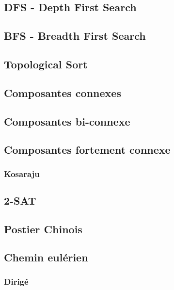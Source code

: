 \documentclass[8pt]{article}
\begin{document}
        \subsection{DFS - Depth First Search}
        {\scriptsize}
        \subsection{BFS - Breadth First Search}
        {\scriptsize}
        \subsection{Topological Sort}
        {\scriptsize}
        \subsection{Composantes connexes}
        {\scriptsize}
        \subsection{Composantes bi-connexe}
        {\scriptsize}
        \subsection{Composantes fortement connexe}
            \subsubsection{Kosaraju}
            {\scriptsize}
        \subsection{2-SAT}
        {\scriptsize}
        \subsection{Postier Chinois}
        \subsection{Chemin eulérien}
            \subsubsection{Dirigé}
            {\scriptsize}
\end{document}
